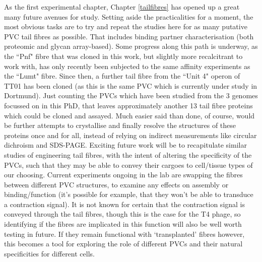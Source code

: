 As the first experimental chapter, Chapter \ref{tailfibres} has opened up a great many future avenues for study. Setting aside the practicalities for a moment, the most obvious tasks are to try and repeat the studies here for as many putative PVC tail fibres as possible. That includes binding partner characterisation (both proteomic and glycan array-based). Some progress along this path is underway, as the ``Pnf" fibre that was cloned in this work, but slightly more recalcitrant to work with, has only recently been subjected to the same affinity experiments as the ``Lumt" fibre. Since then, a further tail fibre from the ``Unit 4" operon of \Pasy{} TT01 has been cloned (as this is the same PVC which is currently under study in Dortmund). Just counting the PVCs which have been studied from the 3 genomes focussed on in this PhD, that leaves approximately another 13 tail fibre proteins which could be cloned and assayed. Much easier said than done, of course, would be further attempts to crystallise and finally resolve the structures of these proteins once and for all, instead of relying on indirect measurements like circular dichroism and SDS-PAGE. Exciting future work will be to recapitulate similar studies of engineering tail fibres, with the intent of altering the specificity of the PVCs, such that they may be able to convey their cargoes to cell/tissue types of our choosing. Current experiments ongoing in the lab are swapping the fibres between different PVC structures, to examine any effects on assembly or binding/function (it's possible for example, that they won't be able to transduce a contraction signal). It is not known for certain that the contraction signal is conveyed through the tail fibres, though this is the case for the T4 phage, so identifying if the fibres are implicated in this function will also be well worth testing in future. If they remain functional with `transplanted' fibres however, this becomes a tool for exploring the role of different PVCs and their natural specificities for different cells.

